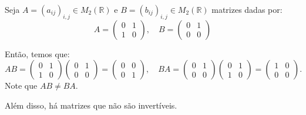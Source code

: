\begin{example}
    Seja $A=(a_{ij})_{i, j}\in M_{2}(\mathbb R)$ e $B=(b_{ij})_{i, j}\in M_{2}(\mathbb R)$ matrizes dadas por:
    \begin{equation*}
        A = \begin{pmatrix}
            0 & 1 \\
            1 & 0
        \end{pmatrix}, \quad B = \begin{pmatrix}
            0 & 1 \\
            0 & 0
        \end{pmatrix}
    \end{equation*}

    Então, temos que:
    \begin{equation*}
        AB = \begin{pmatrix}
            0 & 1 \\
            1 & 0
        \end{pmatrix} \begin{pmatrix}
            0 & 1 \\
            0 & 0
        \end{pmatrix} = \begin{pmatrix}
            0 & 0 \\
            0 & 1
        \end{pmatrix}, \quad BA = \begin{pmatrix}
            0 & 1 \\
            0 & 0
        \end{pmatrix} \begin{pmatrix}
            0 & 1 \\
            1 & 0
        \end{pmatrix} = \begin{pmatrix}
            1 & 0 \\
            0 & 0
        \end{pmatrix}.
    \end{equation*}
    Note que $AB\neq BA$.
\end{example}

Além disso, há matrizes que não são invertíveis.

